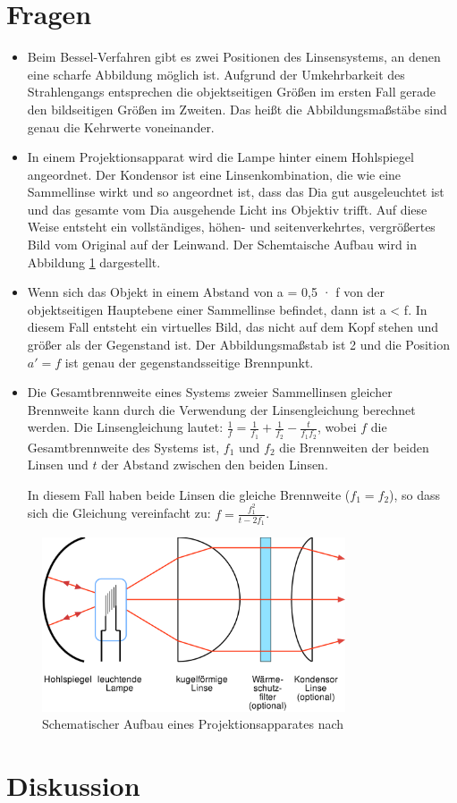 \documentclass[11pt, a4paper]{article}
\begin{document}
    \section{Fragen}
    \begin{itemize}
        \item Beim Bessel-Verfahren gibt es zwei Positionen des Linsensystems, an denen eine scharfe Abbildung möglich ist. Aufgrund der Umkehrbarkeit des Strahlengangs entsprechen die objektseitigen Größen im ersten Fall gerade den bildseitigen Größen im Zweiten. Das heißt die Abbildungsmaßstäbe sind genau die Kehrwerte voneinander.
        \item In einem Projektionsapparat wird die Lampe hinter einem Hohlspiegel angeordnet. Der Kondensor ist eine Linsenkombination, die wie eine Sammellinse wirkt und so angeordnet ist, dass das Dia gut ausgeleuchtet ist und das gesamte vom Dia ausgehende Licht ins Objektiv trifft. Auf diese Weise entsteht ein vollständiges, höhen- und seitenverkehrtes, vergrößertes Bild vom Original auf der Leinwand. Der Schemtaische Aufbau wird in Abbildung \ref{fig:projektionsapparat} dargestellt.
        \item Wenn sich das Objekt in einem Abstand von a = 0,5 · f von der objektseitigen Hauptebene einer Sammellinse befindet, dann ist a < f. In diesem Fall entsteht ein virtuelles Bild, das nicht auf dem Kopf stehen und größer als der Gegenstand ist. Der Abbildungsmaßstab ist 2 und die Position $a'= f$ ist genau der gegenstandsseitige Brennpunkt.
        \item Die Gesamtbrennweite eines Systems zweier Sammellinsen gleicher Brennweite kann durch die Verwendung der Linsengleichung berechnet werden. Die Linsengleichung lautet: $\frac{1}{f} = \frac{1}{f_1} + \frac{1}{f_2} - \frac{t}{f_1 f_2}$, wobei $f$ die Gesamtbrennweite des Systems ist, $f_1$ und $f_2$ die Brennweiten der beiden Linsen und $t$ der Abstand zwischen den beiden Linsen.


        In diesem Fall haben beide Linsen die gleiche Brennweite ($f_1 = f_2$), so dass sich die Gleichung vereinfacht zu: $f = \frac{f_1^2}{t-2f_1}$. 

    \end{itemize}

    \begin{figure}[h]
        \centering
        \includegraphics[width=0.8\textwidth]{Condensor-1-de.svg.png}
        \caption{Schematischer Aufbau eines Projektionsapparates nach \cite{projektionsapparat}}
        \label{fig:projektionsapparat}
    \end{figure}



    \section{Diskussion}


    
    
\end{document}
